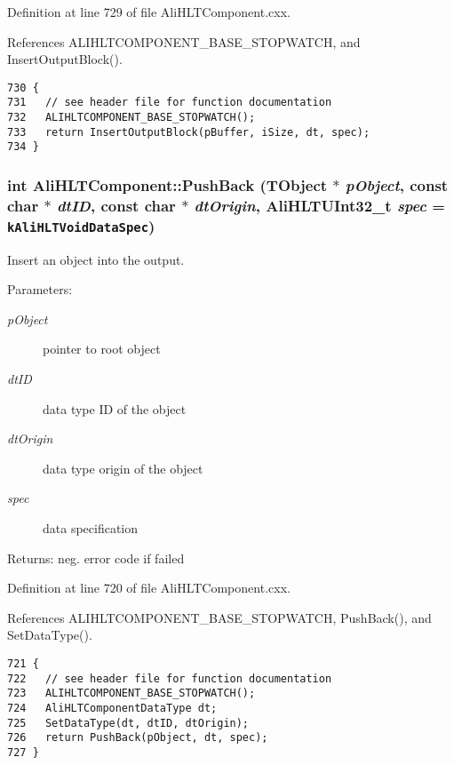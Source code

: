 Definition at line 729 of file Ali\-HLTComponent.cxx.

References ALIHLTCOMPONENT\_\-BASE\_\-STOPWATCH, and Insert\-Output\-Block().

\footnotesize\begin{verbatim}730 {
731   // see header file for function documentation
732   ALIHLTCOMPONENT_BASE_STOPWATCH();
733   return InsertOutputBlock(pBuffer, iSize, dt, spec);
734 }
\end{verbatim}\normalsize 


\subsubsection{\setlength{\rightskip}{0pt plus 5cm}int Ali\-HLTComponent::Push\-Back (TObject $\ast$ {\em p\-Object}, const char $\ast$ {\em dt\-ID}, const char $\ast$ {\em dt\-Origin}, {\bf Ali\-HLTUInt32\_\-t} {\em spec} = {\tt {\bf k\-Ali\-HLTVoid\-Data\-Spec}})\hspace{0.3cm}{\tt  [protected]}}\label{classAliHLTComponent_b24}


Insert an object into the output. \begin{Desc}
\item[Parameters:]
\begin{description}
\item[{\em p\-Object}]pointer to root object \item[{\em dt\-ID}]data type ID of the object \item[{\em dt\-Origin}]data type origin of the object \item[{\em spec}]data specification \end{description}
\end{Desc}
\begin{Desc}
\item[Returns:]neg. error code if failed \end{Desc}


Definition at line 720 of file Ali\-HLTComponent.cxx.

References ALIHLTCOMPONENT\_\-BASE\_\-STOPWATCH, Push\-Back(), and Set\-Data\-Type().

\footnotesize\begin{verbatim}721 {
722   // see header file for function documentation
723   ALIHLTCOMPONENT_BASE_STOPWATCH();
724   AliHLTComponentDataType dt;
725   SetDataType(dt, dtID, dtOrigin);
726   return PushBack(pObject, dt, spec);
727 }
\end{verbatim}\normalsize 


